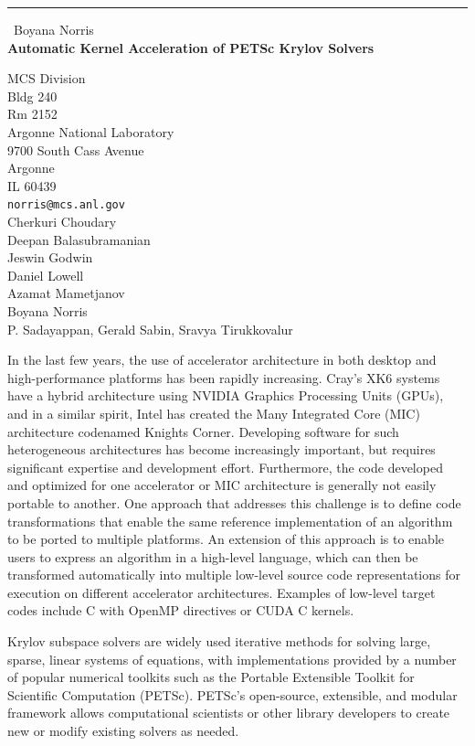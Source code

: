 \documentclass{report}
\begin{document}
\begin{center}
\rule{6in}{1pt} \
{\large Boyana Norris \\
{\bf Automatic Kernel Acceleration of PETSc Krylov Solvers}}

MCS Division \\ Bldg 240 \\ Rm 2152 \\ Argonne National Laboratory \\ 9700 South Cass Avenue \\ Argonne \\ IL 60439
\\
{\tt norris@mcs.anl.gov}\\
Cherkuri Choudary\\
Deepan Balasubramanian\\
Jeswin Godwin\\
Daniel Lowell\\
Azamat Mametjanov\\
Boyana Norris\\
	P. Sadayappan, Gerald Sabin, Sravya Tirukkovalur\end{center}

In the last few years, the use of accelerator architecture in both
desktop and high-performance platforms has been rapidly increasing.
Cray’s XK6 systems have a hybrid architecture using NVIDIA Graphics
Processing Units (GPUs), and in a similar spirit, Intel has created the
Many Integrated Core (MIC) architecture codenamed Knights Corner.
Developing software for such heterogeneous architectures has become
increasingly important, but requires significant expertise and
development effort. Furthermore, the code developed and optimized for one
accelerator or MIC architecture is generally not easily portable to
another. One approach that addresses this challenge is to define code
transformations that enable the same reference implementation of an
algorithm to be ported to multiple platforms. An extension of this
approach is to enable users to express an algorithm in a high-level
language, which can then be transformed automatically into multiple
low-level source code representations for execution on different
accelerator architectures. Examples of low-level target codes include C
with OpenMP directives or CUDA C kernels.

Krylov subspace solvers are widely used iterative methods for solving
large, sparse, linear systems of equations, with implementations provided
by a number of popular numerical toolkits such as the Portable Extensible
Toolkit for Scientific Computation (PETSc). PETSc’s open-source,
extensible, and modular framework allows computational scientists or
other library developers to create new or modify existing solvers as
needed.
\end{document}
